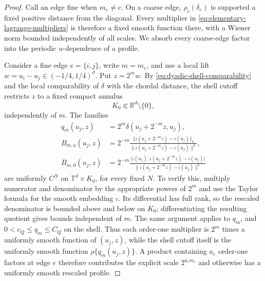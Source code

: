 \documentclass[11pt]{article}
\newcommand{\R}{\mathbb{R}}
\newcommand{\Torus}{\mathbb{T}}
\newcommand{\norm}[1]{\lVert #1\rVert}
\newcommand{\ip}[2]{\langle #1,#2\rangle}
\begin{document}
\begin{proof}
Call an edge fine when \(m_e\ne\mathrm c\).  On a coarse edge,
\(\rho_{\mathrm c}(\delta_e)\) is supported a fixed positive distance from
the diagonal.  Every multiplier in
\eqref{eq:elementary-lagrange-multipliers} is therefore a fixed smooth
function there, with a Wiener norm bounded independently of all scales.  We
absorb every coarse-edge factor into the periodic \(u\)-dependence of a
profile.

Consider a fine edge \(e=\{i,j\}\), write \(m=m_e\), and use a local lift
\(w=u_i-u_j\in(-1/4,1/4)^d\).  Put \(z=2^mw\).  By
\eqref{eq:dyadic-shell-comparability} and the local comparability of
\(\delta\) with the chordal distance, the shell cutoff restricts \(z\) to a
fixed compact annulus
\[
 K_0\Subset\R^d\setminus\{0\},
\]
independently of \(m\).  The families
\begin{align*}
 q_m(u_j,z)
 &=2^m\delta(u_j+2^{-m}z,u_j),\\
 B_{m,a}(u_j,z)
 &=2^{-m}
   \frac{\{\iota(u_j+2^{-m}z)-\iota(u_j)\}_a}
        {\norm{\iota(u_j+2^{-m}z)-\iota(u_j)}^2},\\
 B_{m,0}(u_j,z)
 &=2^{-m}
   \frac{\ip{\iota(u_j)}
   {\iota(u_j+2^{-m}z)-\iota(u_j)}}
        {\norm{\iota(u_j+2^{-m}z)-\iota(u_j)}^2}
\end{align*}
are uniformly \(C^N\) on
\(\Torus^d\times K_0\), for every fixed \(N\).  To verify this, multiply
numerator and denominator by the appropriate powers of \(2^m\) and use the
Taylor formula for the smooth embedding \(\iota\).  Its differential has
full rank, so the rescaled denominator is bounded above and below on
\(K_0\); differentiating the resulting quotient gives bounds independent of
\(m\).  The same argument applies to \(q_m\), and
\(0<c_Q\le q_m\le C_Q\) on the shell.  Thus each order-one multiplier is
\(2^m\) times a uniformly smooth function of \((u_j,z)\), while the shell
cutoff itself is the uniformly smooth function \(\rho\{q_m(u_j,z)\}\).
A product containing \(a_e\) order-one factors at edge \(e\) therefore
contributes the explicit scale \(2^{a_em_e}\) and otherwise has a uniformly
smooth rescaled profile.


\end{proof}
\end{document}

